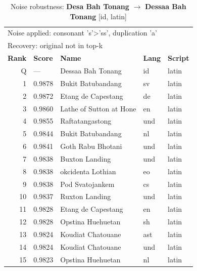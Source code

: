 \begin{table}[htbp]
\centering
\small
\caption{Noise robustness: \textbf{Desa Bah Tonang} $\rightarrow$ \textbf{Dessaa Bah Tonang} [id, latin]}
\label{tab:noise-6}
\begin{tabular}{rllll}
\toprule
\multicolumn{5}{l}{\small Noise applied: consonant 's'>'ss', duplication 'a'} \\
\multicolumn{5}{l}{\small Recovery: original not in top-k} \\
\midrule
\textbf{Rank} & \textbf{Score} & \textbf{Name} & \textbf{Lang} & \textbf{Script} \\
\midrule
\rowcolor{gray!20} Q & --- & Dessaa Bah Tonang & id & latin \\
\midrule
1 & 0.9878 & Bukit Batubandang & sv & latin \\
2 & 0.9872 & Etang de Capestang & de & latin \\
3 & 0.9860 & Lathe of Sutton at Hone & en & latin \\
4 & 0.9855 & Raftatangastong & und & latin \\
5 & 0.9844 & Bukit Batubandang & nl & latin \\
6 & 0.9841 & Goth Rabu Bhotani & und & latin \\
7 & 0.9838 & Buxton Landing & und & latin \\
8 & 0.9838 & okcidenta Lothian & eo & latin \\
9 & 0.9838 & Pod Svatojankem & cs & latin \\
10 & 0.9837 & Ruxton Landing & und & latin \\
11 & 0.9828 & Etang de Capestang & en & latin \\
12 & 0.9828 & Opstina Huehuetan & sh & latin \\
13 & 0.9824 & Koudiat Chatouane & ast & latin \\
14 & 0.9824 & Koudiat Chatouane & und & latin \\
15 & 0.9823 & Opstina Huehuetan & nl & latin \\
\bottomrule
\end{tabular}
\end{table}

